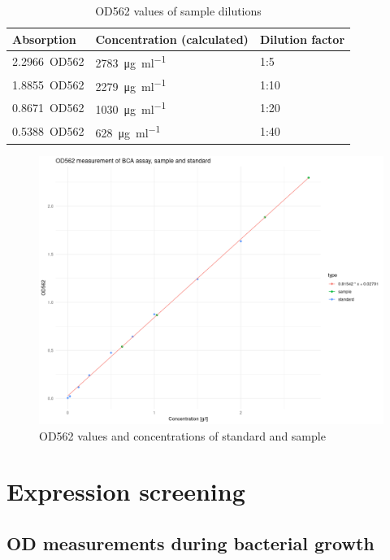 \begin{table}
	\centering
	\begin{tabu}{lll}
		\toprule
		Absorption & Concentration (calculated) & Dilution factor \\
		\midrule
		\SI{2.2966}{OD562} & \SI{2783}{\ug\per\ml} & 1:5 \\
		\SI{1.8855}{OD562} & \SI{2279}{\ug\per\ml} & 1:10 \\
		\SI{0.8671}{OD562} & \SI{1030}{\ug\per\ml} & 1:20 \\
		\SI{0.5388}{OD562} & \SI{628}{\ug\per\ml} & 1:40 \\
		\bottomrule
	\end{tabu}
	\caption{OD562 values of sample dilutions}
	\label{tbl:bca_absorption_sample}
\end{table}

\begin{figure}
	\centering
	\includegraphics[width=\linewidth]{img/bca_assay.png}
	\caption{OD562 values and concentrations of standard and sample}
	\label{fig:bca_absorption}
\end{figure}

\section{Expression screening}

\subsection{OD measurements during bacterial growth}


